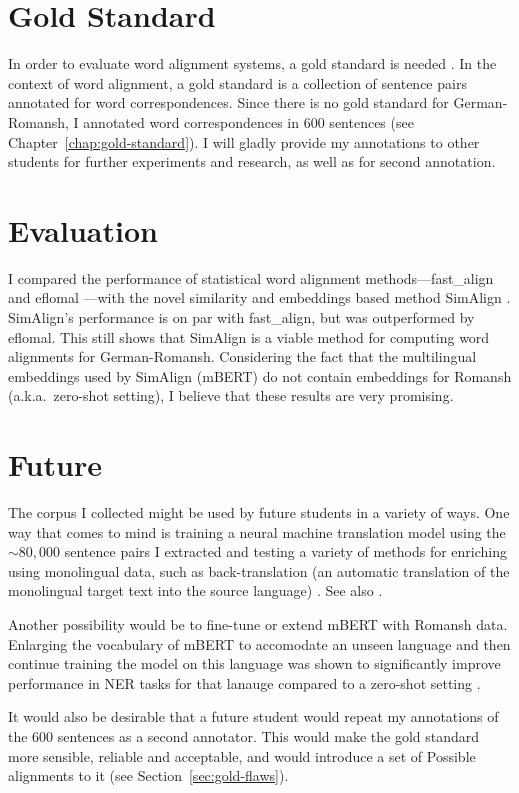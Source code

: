 \section{Gold Standard}
In order to evaluate word alignment systems, a gold standard is needed \autocite[115]{koehn2009}. 
In the context of word alignment, a gold standard is a collection of sentence pairs annotated for word correspondences. 
Since there is no gold standard for German-Romansh, I annotated word correspondences in 600 sentences (see Chapter~\ref{chap:gold-standard}). I will  gladly provide my annotations to other students for further experiments and research, as well as for second annotation.  

\section{Evaluation}
I compared the performance of statistical word alignment methods---fast\_align \autocite{dyer-etal-2013-simple} and eflomal \autocite{Ostling2016efmaral}---with the novel similarity and embeddings based method SimAlign \autocite{jalili-sabet-etal-2020-simalign}. 
SimAlign's performance is on par with fast\_align, but was outperformed by eflomal. 
This still shows that SimAlign is a viable method for computing word alignments for German-Romansh. 
Considering the fact that the multilingual embeddings used by SimAlign (mBERT) do not contain embeddings for Romansh (a.k.a.~zero-shot setting), I believe that these results are very promising.

\section{Future}
The corpus I collected might be used by future students in a variety of ways. 
One way that comes to mind is training a neural machine translation model using the $\sim80,000$ sentence pairs I extracted and testing a variety of methods for enriching using monolingual data, such as back-translation (an automatic translation of the monolingual target text into the source language) \autocite{sennrich-etal-2016-improving}. 
See also \cite{https://doi.org/10.48550/arxiv.2107.04239}.

Another possibility would be to fine-tune or extend mBERT with Romansh data. 
Enlarging the vocabulary of mBERT to accomodate an unseen language and then continue training the model on this language was shown to significantly improve performance in  NER tasks for that lanauge compared to a zero-shot setting \autocite{wang-etal-2020-extending}. 

It would also be desirable that a future student would repeat my annotations of the 600 sentences as a second annotator. 
This would make the gold standard more sensible, reliable and acceptable, and would introduce a set of Possible alignments to it (see Section~\ref{sec:gold-flaws}).




